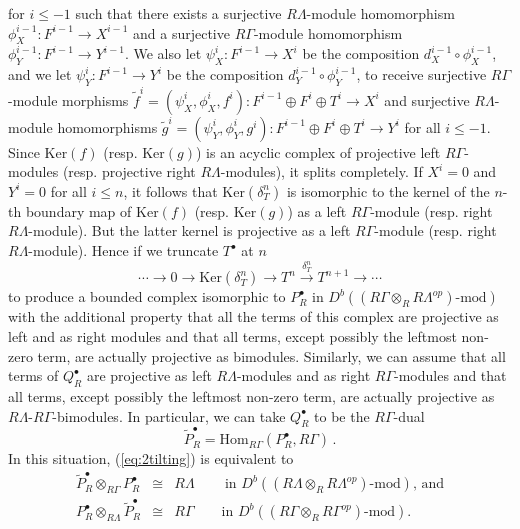 \documentclass{amsart}
\theoremstyle{plain}
\theoremstyle{definition}
\theoremstyle{remark}
\begin{document}
for $i\le -1$ such that there exists a surjective $R\Lambda$-module homomorphism $\phi_X^{i-1}:F^{i-1}\to X^{i-1}$ and a surjective $R\Gamma$-module homomorphism 
$\phi_Y^{i-1}:F^{i-1}\to Y^{i-1}$. We also let $\psi_X^i:F^{i-1}\to X^i$ be the composition $d_X^{i-1}\circ\phi_X^{i-1}$, and we let 
$\psi_Y^i:F^{i-1}\to Y^i$ be the composition $d_Y^{i-1}\circ\phi_Y^{i-1}$, to receive surjective $R\Gamma$-module morphisms 
$\tilde{f}^i=(\psi_X^i,\phi_X^i,f^i):F^{i-1}\oplus F^i\oplus T^i\to X^i$ and surjective $R\Lambda$-module homomorphisms 
$\tilde{g}^i=(\psi_Y^i,\phi_Y^i,g^i):F^{i-1}\oplus F^i\oplus T^i\to Y^i$ for all $i\le -1$.
Since $\mathrm{Ker}(f)$ (resp. $\mathrm{Ker}(g)$) is an acyclic complex of projective
left $R\Gamma$-modules (resp. projective right $R\Lambda$-modules), it splits completely.
If $X^i=0$ and $Y^i=0$ for all $i\le n$, it follows that 
$\mathrm{Ker}(\delta^{n}_T)$ is isomorphic to the kernel of the $n$-th boundary map of
$\mathrm{Ker}(f)$ (resp. $\mathrm{Ker}(g)$) as a left $R\Gamma$-module (resp. right $R\Lambda$-module).
But the latter kernel is projective as a left $R\Gamma$-module (resp. right $R\Lambda$-module).
Hence if we truncate $T^\bullet$ at $n$
$$\cdots \to 0\to \mathrm{Ker}(\delta^{n}_T)\to T^n\xrightarrow{\delta^{n}_T}
T^{n+1}\to \cdots$$
to produce a bounded complex isomorphic to $P_R^\bullet$ 
in $D^b((R\Gamma\otimes_R R\Lambda^{op})\mbox{-mod})$ with the additional property that all the
terms of this complex are projective as left and as right modules and that all terms, except possibly
the leftmost non-zero term, are actually projective as bimodules.
Similarly, we can assume that all terms of
$Q_R^\bullet$ are projective as left $R\Lambda$-modules and as right
$R\Gamma$-modules and that all  terms, except possibly
the leftmost non-zero term, are actually
projective as $R\Lambda$-$R\Gamma$-bimodules. In particular, we can take
$Q_R^\bullet$ to be the $R\Gamma$-dual
\begin{equation}
\label{eq:lambdadual}
\widetilde{P}_R^\bullet = \mathrm{Hom}_{R\Gamma}(P_R^\bullet,R\Gamma)\,.
\end{equation}
In this situation, (\ref{eq:2tilting}) is equivalent to
\begin{eqnarray}
\label{eq:2tiltbetter} 
\widetilde{P}_R^\bullet \otimes_{R\Gamma}P_R^\bullet 
&\cong& R\Lambda \qquad\,
\mbox{in $D^b((R\Lambda\otimes_R R\Lambda^{op})\mbox{-mod})$, and}\\
P_R^\bullet \otimes_{R\Lambda}\widetilde{P}_R^\bullet
&\cong&  R\Gamma \qquad
\mbox{in $D^b((R\Gamma\otimes_R R\Gamma^{op})\mbox{-mod})$.} \nonumber
\end{eqnarray}
\end{document}
